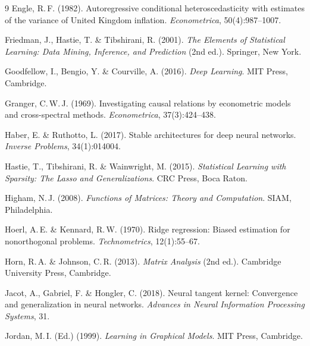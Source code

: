 ﻿\documentclass[12pt, a4paper]{article}
\theoremstyle{definition}
\theoremstyle{remark}
\begin{document}
\begin{thebibliography}{9}
Engle, R.\,F. (1982).
\newblock Autoregressive conditional heteroscedasticity with estimates of the
  variance of United Kingdom inflation.
\newblock \textit{Econometrica}, 50(4):987--1007.

Friedman, J., Hastie, T. \& Tibshirani, R. (2001).
\newblock \textit{The Elements of Statistical Learning: Data Mining, Inference,
  and Prediction} (2nd ed.).
\newblock Springer, New York.

Goodfellow, I., Bengio, Y. \& Courville, A. (2016).
\newblock \textit{Deep Learning}.
\newblock MIT Press, Cambridge.

Granger, C.\,W.\,J. (1969).
\newblock Investigating causal relations by econometric models and
  cross-spectral methods.
\newblock \textit{Econometrica}, 37(3):424--438.

Haber, E. \& Ruthotto, L. (2017).
\newblock Stable architectures for deep neural networks.
\newblock \textit{Inverse Problems}, 34(1):014004.

Hastie, T., Tibshirani, R. \& Wainwright, M. (2015).
\newblock \textit{Statistical Learning with Sparsity: The Lasso and
  Generalizations}.
\newblock CRC Press, Boca Raton.

Higham, N.\,J. (2008).
\newblock \textit{Functions of Matrices: Theory and Computation}.
\newblock SIAM, Philadelphia.

Hoerl, A.\,E. \& Kennard, R.\,W. (1970).
\newblock Ridge regression: Biased estimation for nonorthogonal problems.
\newblock \textit{Technometrics}, 12(1):55--67.

Horn, R.\,A. \& Johnson, C.\,R. (2013).
\newblock \textit{Matrix Analysis} (2nd ed.).
\newblock Cambridge University Press, Cambridge.

Jacot, A., Gabriel, F. \& Hongler, C. (2018).
\newblock Neural tangent kernel: Convergence and generalization in neural
  networks.
\newblock \textit{Advances in Neural Information Processing Systems}, 31.

Jordan, M.\,I. (Ed.) (1999).
\newblock \textit{Learning in Graphical Models}.
\newblock MIT Press, Cambridge.


\end{thebibliography}
\end{document}
